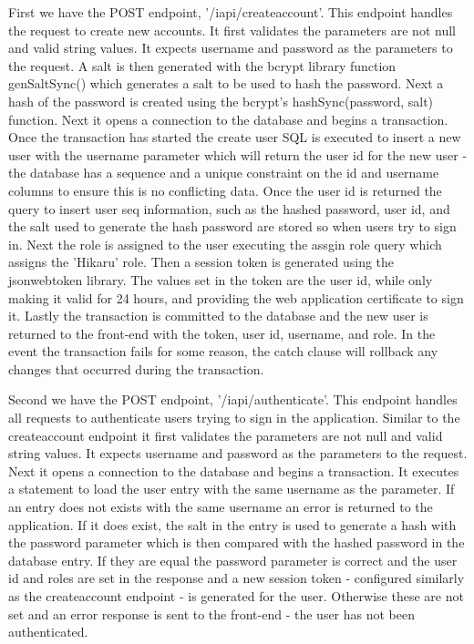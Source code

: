 \documentclass[12pt]{article}
\begin{document}
First we have the POST endpoint, '/iapi/createaccount'. This endpoint handles the request to create new accounts. It first validates the parameters are not null and valid string values. It expects username and password as the parameters to the request. A salt is then generated with the bcrypt library function genSaltSync() which generates a salt to be used to hash the password. Next a hash of the password is created using the bcrypt's hashSync(password, salt) function. Next it opens a connection to the database and begins a transaction. Once the transaction has started the create user SQL is executed to insert a new user with the username parameter which will return the user id for the new user - the database has a sequence and a unique constraint on the id and username columns to ensure this is no conflicting data. Once the user id is returned the query to insert user seq information, such as the hashed password, user id, and the salt used to generate the hash password are stored so when users try to sign in. Next the role is assigned to the user executing the assgin role query which assigns the 'Hikaru' role. Then a session token is generated using the jsonwebtoken library. The values set in the token are the user id, while only making it valid for 24 hours, and providing the web application certificate to sign it. Lastly the transaction is committed to the database and the new user is returned to the front-end with the token, user id, username, and role. In the event the transaction fails for some reason, the catch clause will rollback any changes that occurred during the transaction.

Second we have the POST endpoint, '/iapi/authenticate'. This endpoint handles all requests to authenticate users trying to sign in the application. Similar to the createaccount endpoint it first validates the parameters are not null and valid string values. It expects username and password as the parameters to the request. Next it opens a connection to the database and begins a transaction. It executes a statement to load the user entry with the same username as the parameter. If an entry does not exists with the same username an error is returned to the application. If it does exist, the salt in the entry is used to generate a hash with the password parameter which is then compared with the hashed password in the database entry. If they are equal the password parameter is correct and the user id and roles are set in the response and a new session token - configured similarly as the createaccount endpoint - is generated for the user. Otherwise these are not set and an error response is sent to the front-end - the user has not been authenticated.
\end{document}
